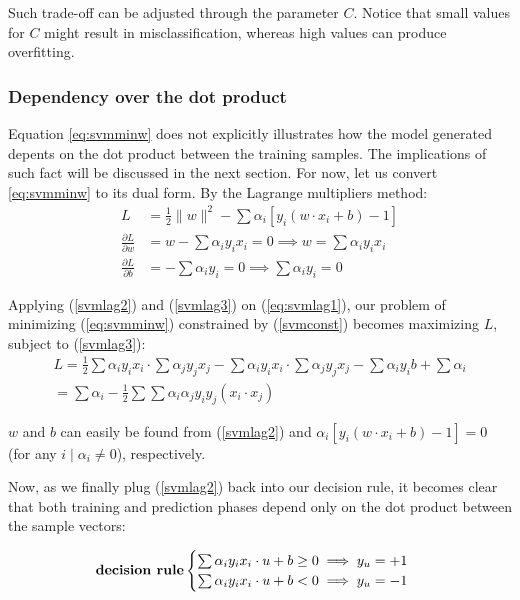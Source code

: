 Such trade-off can be adjusted through the parameter $C$. Notice that small values for $C$ might result in misclassification, whereas high values can produce overfitting.

\subsubsection{Dependency over the dot product}

Equation \ref{eq:svmminw} does not explicitly illustrates how the model generated depents on the dot product between the training samples. The implications of such fact will be discussed in the next section. For now, let us convert \ref{eq:svmminw} to its dual form. By the Lagrange multipliers method: \cite{mitsvm}
\begin{align} \label{eq:svmlag1}
	L &= \frac{1}{2}\|w\|^2 - \sum \alpha_i[y_i(w \cdot x_i +b) -1] \\
	\label{svmlag2}
	\frac{\partial L}{\partial w} &= w -\sum\alpha_i y_i x_i = 0 \implies w = \sum\alpha_i y_i x_i \\
	\label{svmlag3}
	\frac{\partial L}{\partial b} &= -\sum\alpha_i y_i = 0 \implies \sum\alpha_i y_i = 0
\end{align}

Applying (\ref{svmlag2}) and (\ref{svmlag3}) on (\ref{eq:svmlag1}), our problem of minimizing (\ref{eq:svmminw}) constrained by (\ref{svmconst}) becomes maximizing $L$, subject to (\ref{svmlag3}):
\begin{gather*}
L = \frac{1}{2}\sum\alpha_i y_i x_i \cdot \sum\alpha_j y_j x_j
- \sum \alpha_i y_i x_i \cdot \sum \alpha_j y_j x_j
- \sum \alpha_i y_i b + \sum \alpha_i \\
= \sum\alpha_i -\frac{1}{2}\sum\sum\alpha_i\alpha_j y_i y_j (x_i \cdot x_j)
\end{gather*}

$w$ and $b$ can easily be found from (\ref{svmlag2}) and $\alpha_i[y_i(w \cdot x_i + b) - 1] = 0$ (for any $i \mid \alpha_i \ne 0$), respectively.

Now, as we finally plug (\ref{svmlag2}) back into our decision rule, it becomes clear that both training and prediction phases depend only on the dot product between the sample vectors: \cite{mitsvm}

$$\text{\textbf{decision rule}} \begin{cases}
	\sum\alpha_i y_i x_i \cdot u +b \geq 0 \implies y_u=+1\\
	\sum\alpha_i y_i x_i \cdot u +b < 0 \implies y_u=-1\\
\end{cases}$$

